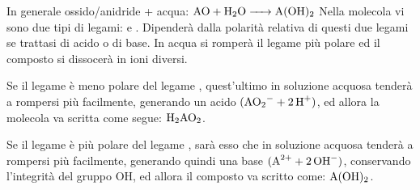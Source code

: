 In generale ossido/anidride + acqua:
\(\ce{AO + H_2O -> A(OH)_2}\)
Nella molecola vi sono due tipi di legami:  e . Dipenderà dalla polarità relativa di questi due legami se trattasi di acido o di base. In acqua si romperà il legame più polare ed il composto si dissocerà in ioni diversi.

Se il legame  è meno polare del legame , quest'ultimo in soluzione acquosa tenderà a rompersi più facilmente, generando un acido \(\ce{(AO_2- + 2H+)}\), ed allora la molecola va scritta come segue: \(\ce{H_2AO_2}\).

Se il legame  è più polare del legame , sarà esso che in soluzione acquosa tenderà a rompersi più facilmente, generando quindi una base \(\ce{(A^{2+} + 2OH^-)}\), conservando l’integrità del gruppo OH, ed allora il composto va scritto come: $\rm A(OH)_2$.
